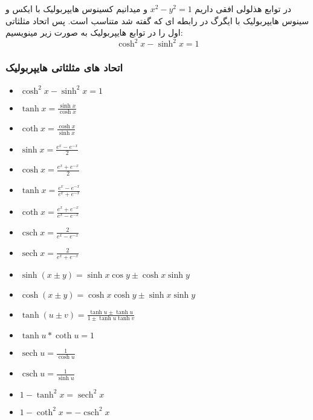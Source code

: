 \documentclass[12pt, a4paper, oneside]{article}
\DeclareMathOperator{\sech}{sech}
\DeclareMathOperator{\csch}{csch}
\begin{document}
در توابع هذلولی افقی داریم $x^2 - y^2 = 1$ و میدانیم کسینوس هایپربولیک با ایکس و سینوس هایپربولیک با ایگرگ در رابطه ای که گفته شد متناسب است.
پس اتحاد مثلثاتی اول را در توابع هایپربولیک به صورت زیر مینویسیم: 
\[\cosh^2 x - \sinh^2 x = 1\]
\subsubsection{اتحاد های مثلثاتی هایپربولیک}
\begin{latin}
\begin{itemize}
    \item $\cosh^2 x - \sinh^2 x = 1$
    \item $\tanh x = \frac{\sinh x}{\cosh x}$
    \item $\coth x = \frac{\cosh x}{\sinh x}$
    \item $\sinh x = \frac{e^x - e^{-x}}{2}$
    \item $\cosh x = \frac{e^x + e^{-x}}{2}$
    \item $\tanh x = \frac{e^x - e^{-x}}{e^x + e^{-x}}$
    \item $\coth x = \frac{e^x + e^{-x}}{e^x - e^{-x}}$
    \item $\csch x = \frac{ 2 }{ e^x - e^{ -x } }$
    \item $\sech x = \frac{ 2 }{ e^x + e^{ -x } }$
    \item $\sinh(x \pm y) = \sinh x\cos y \pm \cosh x\sinh y$
    \item $\cosh(x \pm y) = \cosh x\cosh y \pm \sinh x\sinh y$
    \item $\tanh(u \pm v) = \frac{ \tanh u \pm \tanh u }{ 1 \pm \tanh u\tanh v }$
    \item $\tanh u * \coth u = 1$
    \item $\sech u = \frac{1}{ \cosh u }$
    \item $\csch u = \frac{1}{\sinh u }$
    \item $1-\tanh^2x = \sech^2x$
    \item $1-\coth^2x = -\csch^2x$
\end{itemize}
\end{latin}
\end{document}
